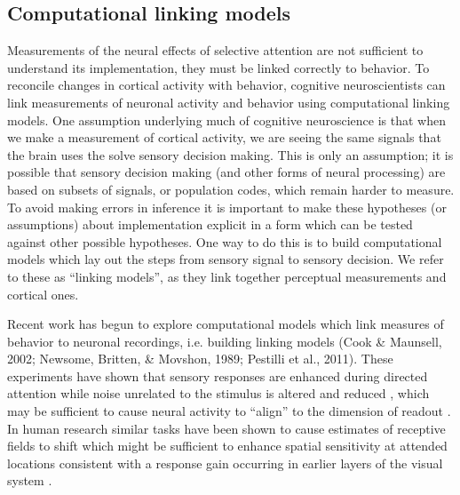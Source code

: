 \subsection{Computational linking models}

Measurements of the neural effects of selective attention are not sufficient to understand its implementation, they must be linked correctly to behavior. To reconcile changes in cortical activity with behavior, cognitive neuroscientists can link measurements of neuronal activity and behavior using computational linking models. One assumption underlying much of cognitive neuroscience is that when we make a measurement of cortical activity, we are seeing the same signals that the brain uses the solve sensory decision making. This is only an assumption; it is possible that sensory decision making (and other forms of neural processing) are based on subsets of signals, or population codes, which remain harder to measure. To avoid making errors in inference it is important to make these hypotheses (or assumptions) about implementation explicit in a form which can be tested against other possible hypotheses. One way to do this is to build computational models which lay out the steps from sensory signal to sensory decision. We refer to these as “linking models”, as they link together perceptual measurements and cortical ones. 

Recent work has begun to explore computational models which link measures of behavior to neuronal recordings, i.e. building linking models \citep{Barlow1972-kz,Brindley1960-gq,Cohen2010-xs} (Cook & Maunsell, 2002; Newsome, Britten, & Movshon, 1989; Pestilli et al., 2011). These experiments have shown that sensory responses are enhanced during directed attention while noise unrelated to the stimulus is altered and reduced \citep{Ecker2016-ro,Rabinowitz2015-uz,Snyder2018-yr}, which may be sufficient to cause neural activity to ``align'' to the dimension of readout \citep{Ruff2018-yx}. In human research similar tasks have been shown to cause estimates of receptive fields to shift \citep{Klein2014-oe} which might be sufficient to enhance spatial sensitivity at attended locations \citep{Klein2016-ox,Vo2017-oi} consistent with a response gain occurring in earlier layers of the visual system \citep{Baruch2014-gy,Miconi2016-ip}.
 
